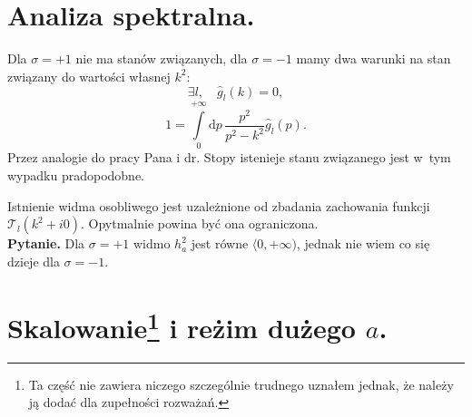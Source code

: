 \documentclass[a4paper,11pt]{article}
\newcommand{\de}{\mathrm{d}}
\newcommand{\T}{\mathcal{T}_{ l }}
\newcommand{\gH}{\widehat{ g }}
\begin{document}
\section*{Analiza spektralna.}
Dla $\sigma = +1$ nie ma stanów związanych, dla $\sigma = -1$ mamy dwa warunki na stan związany do wartości własnej $k^{ 2 }$:
\begin{equation}
\exists l, \quad \widehat{ g }_{ l }( k ) = 0, \label{eq:8}
\end{equation}
\begin{equation}
1 = \int\limits_{ 0 }^{ +\infty } \de p \, \frac{ p^{ 2 } }{ p^{ 2 } - k^{ 2 } } \gH_{ l }( p ). \label{eq:9}
\end{equation}
Przez analogie do pracy Pana i dr. Stopy istenieje stanu związanego jest w~tym wypadku pradopodobne.

Istnienie widma osobliwego jest uzależnione od zbadania zachowania funkcji $\T( k^{ 2 } + i 0 )$. Opytmalnie powina być ona ograniczona. \\
\textbf{Pytanie.} Dla $\sigma = +1$ widmo $h_{ a }^{ 2 }$ jest równe $\langle 0, +\infty )$, jednak nie wiem co się dzieje dla $\sigma = -1$.

\section*{Skalowanie\footnote{Ta część nie zawiera niczego szczególnie trudnego uznałem jednak, że należy ją dodać dla zupełności rozważań.} i reżim dużego $a$.}
\end{document}
